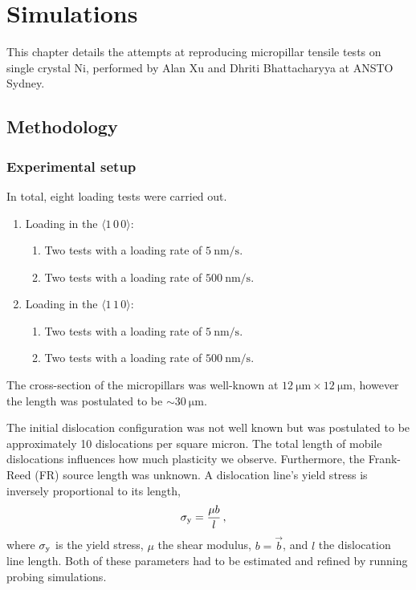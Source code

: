 \chapter{Simulations}\label{c:simulations}

This chapter details the attempts at reproducing micropillar tensile tests on single crystal Ni, performed by Alan Xu and Dhriti Bhattacharyya at ANSTO Sydney.

\section{Methodology}

\subsection{Experimental setup}
\label{ss:experimentalSetup}

In total, eight loading tests were carried out.
\begin{enumerate}
    \item Loading in the $\langle 1\, 0\, 0 \rangle$:
          \begin{enumerate}
              \item Two tests with a loading rate of $\SI{5}{\nano\metre\per\second}$.
              \item Two tests with a loading rate of $\SI{500}{\nano\metre\per\second}$.
          \end{enumerate}
    \item Loading in the $\langle 1\, 1\, 0 \rangle$:
          \begin{enumerate}
              \item Two tests with a loading rate of $\SI{5}{\nano\metre\per\second}$.
              \item Two tests with a loading rate of $\SI{500}{\nano\metre\per\second}$.
          \end{enumerate}
\end{enumerate}

The cross-section of the micropillars was well-known at $\SI{12}{\micro\metre} \times \SI{12}{\micro\metre}$, however the length was postulated to be $\sim \SI{30}{\micro\metre}$.

The initial dislocation configuration was not well known but was postulated to be approximately 10 dislocations per square micron. The total length of mobile dislocations influences how much plasticity we observe. Furthermore, the Frank-Reed (FR) source length was unknown. A dislocation line's yield stress is inversely proportional to its length,
\begin{align}
    \sigma_{\textrm{y}} & = \dfrac{\mu b}{l}\,,
\end{align}
where $\sigma_{\textrm{y}}$ is the yield stress, $\mu$ the shear modulus, $b =  \vec{b} $, and $l$ the dislocation line length. Both of these parameters had to be estimated and refined by running probing simulations.


